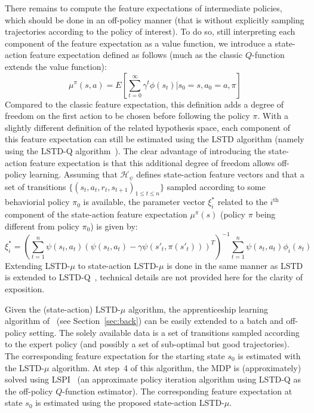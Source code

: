 \documentclass{jfpda2011}
\begin{document}
There remains to compute the feature expectations of intermediate
policies, which should be done in an off-policy manner (that is
without explicitly sampling trajectories according to the policy of
interest). To do so, still interpreting each component of the
feature expectation as a value function, we introduce a state-action
feature expectation defined as follows (much as the classic
$Q$-function extends the value function):
\begin{equation}
  \mu^\pi(s,a) = E[\sum_{t=0}^\infty \gamma^t
  \phi(s_t)|s_0=s,a_0=a,\pi]
\end{equation}
Compared to the classic feature expectation, this definition adds a
degree of freedom on the first action to be chosen before following
the policy $\pi$. With a slightly different definition of the
related hypothesis space, each component of this feature expectation
can still be estimated using the LSTD algorithm (namely using the
LSTD-Q algorithm~\citep{lagoudakis2003least}). The clear advantage of
introducing the state-action feature expectation is that this
additional degree of freedom allows off-policy learning. Assuming
that $\mathcal{H}_\psi$ defines state-action feature vectors and
that a set of transitions $\{(s_t,a_t,r_t,s_{t+1})_{1\leq t \leq
n}\}$ sampled according to some behaviorial policy $\pi_0$ is
available, the parameter vector $\xi_i^*$ related to the
$i^\text{th}$ component of the state-action feature expectation
$\mu^\pi(s)$ (policy $\pi$ being different from policy $\pi_0$) is
given by:
\begin{equation}
  \xi_i^* = \left(\sum_{t=1}^n
  \psi(s_t,a_t)(\psi(s_t,a_t)-\gamma\psi(s'_{t},\pi(s'_t)))^T\right)^{-1}
  \sum_{t=1}^n \psi(s_t,a_t) \phi_i(s_t)
\end{equation}
Extending LSTD-$\mu$ to state-action LSTD-$\mu$ is done in the same
manner as LSTD is extended to LSTD-Q~\citep{lagoudakis2003least},
technical details are not provided here for the clarity of
exposition.

Given the (state-action) LSTD-$\mu$ algorithm, the apprenticeship
learning algorithm of~\citep{abbeel2004apprenticeship} (see
Section~\ref{sec:back}) can be easily extended to a batch and
off-policy setting. The solely available data is a set of
transitions sampled according to the expert policy  (and possibly a set of sub-optimal but good trajectories). The
corresponding feature expectation for the starting state $s_0$ is
estimated with the LSTD-$\mu$ algorithm. At step~4 of this
algorithm, the MDP is (approximately) solved using
LSPI~\citep{lagoudakis2003least} (an approximate policy iteration
algorithm using LSTD-Q as the off-policy $Q$-function estimator).
The corresponding feature expectation at state $s_0$ is estimated
using the proposed state-action LSTD-$\mu$.
\end{document}
